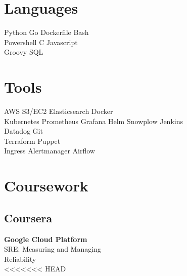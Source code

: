 \documentclass[]{deedy-resume-openfont}
\begin{document}
%
%

%
%

\begin{minipage}[t]{0.33\textwidth} 


\section{Languages} 
Python \textbullet{}   Go  \textbullet{} Dockerfile \textbullet{} Bash \\
\textbullet{} Powershell \textbullet{} C  \textbullet{} Javascript \\
 Groovy \textbullet{} SQL
\sectionsep


\section{Tools} 
AWS S3/EC2 \textbullet{} Elasticsearch \textbullet{} Docker  \\
Kubernetes \textbullet{} Prometheus \textbullet{} Grafana Helm \textbullet{} Snowplow \textbullet{} Jenkins \\
 Datadog  \textbullet{} Git\\
Terraform \textbullet{} Puppet   \\ 
Ingress \textbullet{} Alertmanager \textbullet{} Airflow
\sectionsep




\section{Coursework}
\subsection{Coursera}
\textbf{Google Cloud Platform} \\
\textbullet{} SRE: Measuring and Managing \\
\hspace{0.7em} Reliability \\
<<<<<<< HEAD


\end{minipage}
\end{document}
